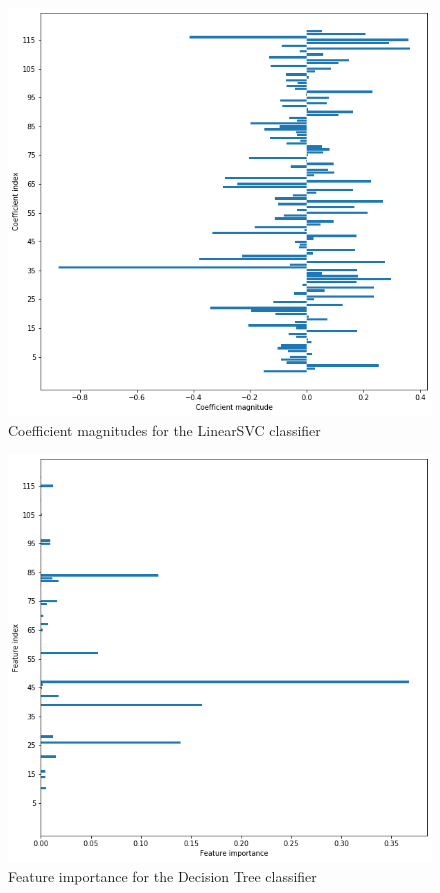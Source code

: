 \begin{appendix}
    \begin{figure}[ht]
    \centering
      \includegraphics[width=\linewidth]{Figures/fs_linearsvc.png}
      \caption{Coefficient magnitudes for the LinearSVC classifier}
      \label{fig:fs_linearsvc}
    \end{figure}
    
    \begin{figure}[ht]
    \centering
      \includegraphics[width=\linewidth]{Figures/fs_tree.png}
      \caption{Feature importance for the Decision Tree classifier}
      \label{fig:fs_tree}
    \end{figure}
    

\end{appendix}

